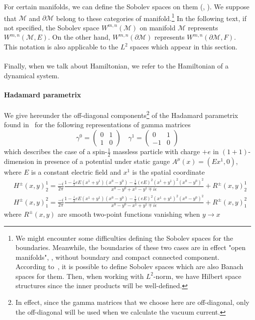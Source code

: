 For certain manifolds, we can define the Sobolev spaces on them (\cite{Hebey1996}, \cite{Eichhorn1996}).
We suppose that $\mathcal{M}$ and $\partial\mathcal{M}$ belong to these categories of manifold.\footnote{
We might encounter some difficulties defining the Sobolev spaces for the boundaries. Meanwhile, the boundaries of these two cases are in effect "open manifolds", \ie, without boundary and compact connected component. 
According to~\cite{Eichhorn1996}, it is possible to define Sobolev spaces which are also Banach spaces for them.
Then, when working with $L^2$-norm, we have Hilbert space structures since the inner products will be well-defined.  
}
In the following text, if not specified, the Sobolev space $W^{m,n}(\mathcal{M})$ on manifold $\mathcal{M}$ represents $W^{m,n}(\mathcal{M}, E)$.
On the other hand, $W^{m,n}(\partial \mathcal{M})$ represents $W^{m,n}(\partial \mathcal{M}, F)$.
This notation is also applicable to the $L^2$ spaces which appear in this section. \\\\
Finally, when we talk about Hamiltonian, we refer to the Hamiltonian of a dynamical system.
%
\paragraph{Hadamard parametrix}
We give hereunder the off-diagonal components\footnote{
In effect, since the gamma matrices that we choose here are off-diagonal, only the off-diagonal will be used when we calculate the vacuum current.
}
 of the Hadamard parametrix found in~\cite{Zahn2015} for the following representations of gamma matrices
\begin{equation*}
\gamma^0 = \begin{pmatrix}
0 & 1 \\
1 & 0 \end{pmatrix}  \quad  \gamma^1 = \begin{pmatrix}
0  & 1 \\
-1 & 0
\end{pmatrix}
\end{equation*}
which describes the case of a spin-$\frac 1 2$ massless particle with charge $+e$ in $(1+1)$-dimension in presence of a potential under static gauge $A^\mu(x) = (Ex^1, 0)$, where $E$ is a constant electric field and $x^1$ is the spatial coordinate
\begin{equation}\label{vacuum-hadamardparametrix}
\begin{split}
& H^\pm (x, y)^1_2 = \frac{-i}{2\pi}\frac{1-\frac i 2 e E(x^1 + y^1)(x^0-y^0) 
- \frac 1 8 (eE)^2(x^1 + y^1)^2(x^0 - y^0)^2}{x^0 - y^0 + x^1 - y^1 \mp i \epsilon}  + R^\pm(x,y)^{1}_2\\
& H^\pm (x, y)^2_1 = \frac{-i}{2\pi}\frac{1-\frac i 2 e E(x^1 + y^1)(x^0-y^0) 
- \frac 1 8 (eE)^2(x^1 + y^1)^2(x^0 - y^0)^2}{x^0 - y^0 - x^1 + y^1 \mp i \epsilon} + R^\pm(x,y)^{2}_1
\end{split}
\end{equation}
where $R^\pm(x,y)$ are smooth two-point functions vanishing when $y\rightarrow x$
